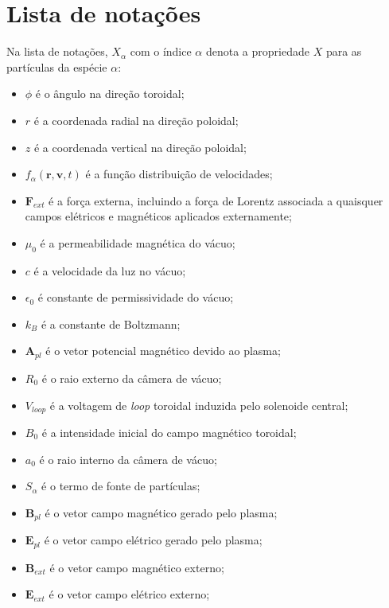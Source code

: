 \documentclass[12pt,oneside,a4paper]{abntex2}
\begin{document}
\chapter*{Lista de notações}
\label{Listanot}
\noindent Na lista de notações, $X_\alpha$ com o índice $\alpha$ denota a propriedade $X$ para as partículas da espécie $\alpha$:\\
\begin{itemize}
\item $\phi$ é o ângulo na direção toroidal; 
\item $r$ é a coordenada radial na direção poloidal;  
\item $z$ é a coordenada vertical na direção poloidal;
\item $f_\alpha(\bm{r},\bm{v},t)$ é a função distribuição de velocidades;
\item $\bm{F}_{ext}$ é a força externa, incluindo a força de Lorentz associada a quaisquer campos elétricos e magnéticos aplicados externamente;
\item $\mu_0$ é a permeabilidade magnética do vácuo;
\item $c$ é a velocidade da luz no vácuo; 
\item $\epsilon_0$ é constante de permissividade do vácuo; %
\item $k_B$ é a constante de Boltzmann;
\item $\bm{A}_{pl}$ é o vetor potencial magnético devido ao plasma;
\item $R_0$ é o raio externo da câmera de vácuo;
\item $V_{loop}$ é a voltagem de \textit{loop} toroidal induzida pelo solenoide central;
\item $B_0$ é a intensidade inicial do campo magnético toroidal; 
\item $a_0$ é o raio interno da câmera de vácuo;
\item $S_\alpha$ é o termo de fonte de partículas;
\item $\bm{B}_{pl}$ é o vetor campo magnético gerado pelo plasma; %
\item $\bm{E}_{pl}$ é o vetor campo elétrico gerado pelo plasma;
\item $\bm{B}_{ext}$ é o vetor campo magnético externo;
\item $\bm{E}_{ext}$ é o vetor campo elétrico externo;

\end{itemize}
\end{document}
